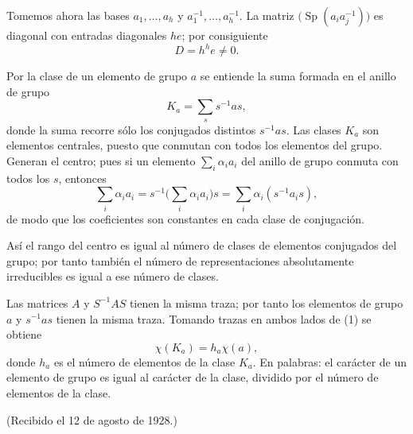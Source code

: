\documentclass[11pt]{article}
\begin{document}
Tomemos ahora las bases $a_1,\ldots,a_h$ y $a_1^{-1},\ldots,a_h^{-1}$. La matriz $\bigl(\operatorname{Sp}(a_i a_j^{-1})\bigr)$ es diagonal con entradas diagonales $he$; por consiguiente
\[
        D=h^h e\ne0.
\]

Por la clase de un elemento de grupo $a$ se entiende la suma formada en el anillo de grupo
\[
        K_a=\sum_s s^{-1}as,                              \tag{1}
\]
donde la suma recorre sólo los conjugados distintos $s^{-1}as$. Las clases $K_a$ son elementos centrales, puesto que conmutan con todos los elementos del grupo. Generan el centro; pues si un elemento $\sum_i \alpha_i a_i$ del anillo de grupo conmuta con todos los $s$, entonces
\[
        \sum_i\alpha_i a_i=s^{-1}\biggl(\sum_i\alpha_i a_i\biggr)s
        =\sum_i\alpha_i(s^{-1}a_i s),
\]
de modo que los coeficientes son constantes en cada clase de conjugación.

Así el rango del centro es igual al número de clases de elementos conjugados del grupo; por tanto también el número de representaciones absolutamente irreducibles es igual a ese número de clases.

Las matrices $A$ y $S^{-1}AS$ tienen la misma traza; por tanto los elementos de grupo $a$ y $s^{-1}as$ tienen la misma traza. Tomando trazas en ambos lados de (1) se obtiene
\[
        \chi(K_a)=h_a\chi(a),
\]
donde $h_a$ es el número de elementos de la clase $K_a$. En palabras: el carácter de un elemento de grupo es igual al carácter de la clase, dividido por el número de elementos de la clase.

\begin{center}
(Recibido el 12 de agosto de 1928.)
\end{center}
\end{document}
